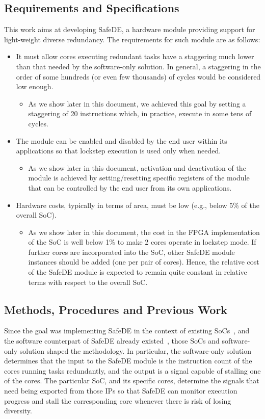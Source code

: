 \subsection{Requirements and Specifications}

This work aims at developing SafeDE, a hardware module providing support for light-weight diverse redundancy. The requirements for such module are as follows:
\begin{itemize}
\item It must allow cores executing redundant tasks have a staggering much lower than that needed by the software-only solution. In general, a staggering in the order of some hundreds (or even few thousands) of cycles would be considered low enough. 
\begin{itemize}
\item As we show later in this document, we achieved this goal by setting a staggering of 20 instructions which, in practice, execute in some tens of cycles.
\end{itemize}
\item The module can be enabled and disabled by the end user within its applications so that lockstep execution is used only when needed. 
\begin{itemize}
\item As we show later in this document, activation and deactivation of the module is achieved by setting/resetting specific registers of the module that can be controlled by the end user from its own applications.
\end{itemize}
\item Hardware costs, typically in terms of area, must be low (e.g., below 5\% of the overall SoC).
\begin{itemize}
\item As we show later in this document, the cost in the FPGA implementation of the SoC is well below 1\% to make 2 cores operate in lockstep mode. If further cores are incorporated into the SoC, other SafeDE module instances should be added (one per pair of cores). Hence, the relative cost of the SafeDE module is expected to remain quite constant in relative terms with respect to the overall SoC.
\end{itemize}
\end{itemize}


\subsection{Methods, Procedures and Previous Work}
Since the goal was implementing SafeDE in the context of existing SoCs~\cite{gomez2020risc,SELENEgit}, and the software counterpart of SafeDE already existed~\cite{alcaide2020software}, those SoCs and software-only solution shaped the methodology. In particular, the software-only solution determines that the input to the SafeDE module is the instruction count of the cores running tasks redundantly, and the output is a signal capable of stalling one of the cores. The particular SoC, and its specific cores, determine the signals that need being exported from those IPs so that SafeDE can monitor execution progress and stall the corresponding core whenever there is risk of losing diversity.

